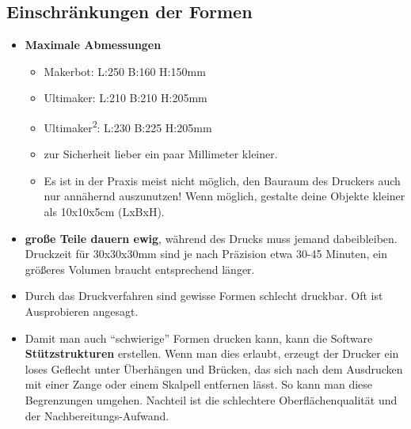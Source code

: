 \documentclass{\basedir/fablab-document}
\newcommand{\ts}[1]{\textsuperscript{#1}}
\begin{document}
\subsection{Einschränkungen der Formen}
\begin{itemize}
\item \textbf{Maximale Abmessungen} 
\begin{itemize}
 \item Makerbot: L:250 B:160 H:150mm
 \item Ultimaker: L:210 B:210 H:205mm
 \item Ultimaker\ts2: L:230 B:225 H:205mm
 \item zur Sicherheit lieber ein paar Millimeter kleiner.
 \item Es ist in der Praxis meist nicht möglich, den Bauraum des Druckers auch nur annähernd auszunutzen! Wenn möglich, gestalte deine Objekte kleiner als 10x10x5cm (LxBxH).
\end{itemize}
\item \textbf{große Teile dauern ewig}, während des Drucks muss jemand dabeibleiben. Druckzeit für 30x30x30mm sind je
nach Präzision etwa 30-45 Minuten, ein größeres Volumen braucht entsprechend länger.
\item Durch das Druckverfahren sind gewisse Formen schlecht druckbar. Oft ist Ausprobieren angesagt.
\item Damit man auch \enquote{schwierige} Formen drucken kann, kann die Software \textbf{Stützstrukturen} erstellen. Wenn man dies erlaubt,
erzeugt der Drucker ein loses Geflecht unter Überhängen und Brücken,
das sich nach dem Ausdrucken mit einer Zange oder einem Skalpell entfernen lässt. So kann
man diese Begrenzungen umgehen. Nachteil ist die schlechtere
Oberflächenqualität und der Nachbereitungs-Aufwand.
\end{itemize}
\end{document}
